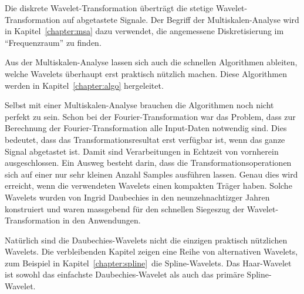 Die diskrete Wavelet-Transformation überträgt die stetige
Wavelet-Transformation auf abgetastete Signale.
Der Begriff der Multiskalen-Analyse wird in Kapitel~\ref{chapter:msa}
dazu verwendet, die angemessene Diskretisierung im ``Frequenzraum''
zu finden.

Aus der Multiskalen-Analyse lassen sich auch die schnellen Algorithmen
%
ableiten, welche Wavelets überhaupt erst praktisch nützlich machen.
Diese Algorithmen werden in Kapitel~\ref{chapter:algo} hergeleitet.

Selbst mit einer Multiskalen-Analyse brauchen die Algorithmen noch nicht
perfekt zu sein.
Schon bei der Fourier-Transformation war das Problem, dass zur Berechnung
der Fourier-Trans\-for\-ma\-tion alle Input-Daten notwendig sind.
Dies bedeutet, dass das Transformationsresultat erst verfügbar ist,
wenn das ganze Signal abgetastet ist.
Damit sind Verarbeitungen in Echtzeit von vornherein ausgeschlossen.
Ein Ausweg besteht darin, dass die Transformationsoperationen sich auf
einer nur sehr kleinen Anzahl Samples ausführen lassen.
Genau dies wird erreicht, wenn die verwendeten Wavelets einen kompakten Träger
haben.
Solche Wavelets wurden von Ingrid Daubechies in den neunzehnachtizger
%
Jahren konstruiert und waren massgebend für den schnellen Siegeszug 
der Wavelet-Transformation in den Anwendungen.

Natürlich sind die Daubechies-Wavelets nicht die einzigen praktisch
%
nützlichen Wavelets.
Die verbleibenden Kapitel zeigen eine Reihe von alternativen Wavelets,
zum Beispiel in Kapitel~\ref{chapter:spline} die Spline-Wavelets.
%
Das Haar-Wavelet ist sowohl das einfachste Daubechies-Wavelet als auch
das primäre Spline-Wavelet.










